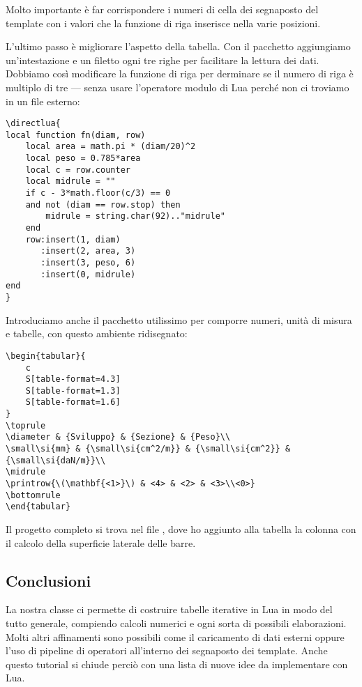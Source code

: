 Molto importante è far corrispondere i numeri di cella dei segnaposto del
template con i valori che la funzione di riga inserisce nella varie posizioni.

L'ultimo passo è migliorare l'aspetto della tabella. Con il pacchetto
 aggiungiamo un'intestazione e un filetto ogni tre righe per
facilitare la lettura dei dati. Dobbiamo così modificare la funzione di riga per
derminare se il numero di riga è multiplo di tre --- senza usare l'operatore
modulo \key{\%} di Lua perché non ci troviamo in un file esterno:
\begin{Verbatim}
\directlua{
local function fn(diam, row)
    local area = math.pi * (diam/20)^2
    local peso = 0.785*area
    local c = row.counter
    local midrule = ""
    if c - 3*math.floor(c/3) == 0
    and not (diam == row.stop) then
        midrule = string.char(92).."midrule"
    end
    row:insert(1, diam)
       :insert(2, area, 3)
       :insert(3, peso, 6)
       :insert(0, midrule)
end
}
\end{Verbatim}

Introduciamo anche il pacchetto  utilissimo per comporre numeri,
unità di misura e tabelle, con questo ambiente  ridisegnato:
\begin{Verbatim}
\begin{tabular}{
    c
    S[table-format=4.3]
    S[table-format=1.3]
    S[table-format=1.6]
}
\toprule
\diameter & {Sviluppo} & {Sezione} & {Peso}\\
\small\si{mm} & {\small\si{cm^2/m}} & {\small\si{cm^2}} & {\small\si{daN/m}}\\
\midrule
\printrow{\(\mathbf{<1>}\) & <4> & <2> & <3>\\<0>}
\bottomrule
\end{tabular}
\end{Verbatim}

Il progetto completo si trova nel file , dove ho
aggiunto alla tabella la colonna con il calcolo della superficie laterale delle
barre.


\subsection{Conclusioni}

La nostra classe  ci permette di costruire tabelle iterative in Lua in
modo del tutto generale, compiendo calcoli numerici e ogni sorta di possibili
elaborazioni. Molti altri affinamenti sono possibili come il caricamento di dati
esterni oppure l'uso di pipeline di operatori all'interno dei segnaposto dei
template. Anche questo tutorial si chiude perciò con una lista di nuove idee da
implementare con Lua.

